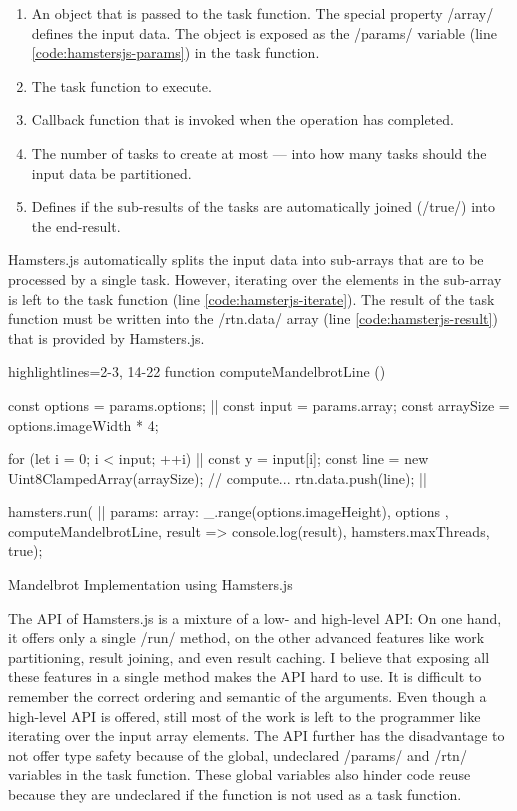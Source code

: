 \begin{enumerate}
	\item An object that is passed to the task function. The special property \javascriptinline/array/ defines the input data. The object is exposed as the \javascriptinline/params/ variable (line \ref{code:hamstersjs-params}) in the task function.
	\item The task function to execute.
	\item Callback function that is invoked when the operation has completed.
	\item The number of tasks to create at most --- into how many tasks should the input data be partitioned. 
	\item Defines if the sub-results of the tasks are automatically joined (\javascriptinline/true/) into the end-result.
\end{enumerate}

Hamsters.js automatically splits the input data into sub-arrays that are to be processed by a single task. However, iterating over the elements in the sub-array is left to the task function (line \ref{code:hamsterjs-iterate}). The result of the task function must be written into the \javascriptinline/rtn.data/ array (line \ref{code:hamsterjs-result}) that is provided by Hamsters.js. 

\begin{listing}
\begin{javascriptcode*}{highlightlines={2-3, 14-22}}
function computeMandelbrotLine () {
	const options = params.options; |$\label{code:hamstersjs-params}$|
	const input = params.array;
	const arraySize = options.imageWidth * 4;

	for (let i = 0; i < input; ++i) {|$\label{code:hamsterjs-iterate}$|
		const y = input[i];
		const line = new Uint8ClampedArray(arraySize);
		// compute...
		rtn.data.push(line); |$\label{code:hamsterjs-result}$|
	}
}

hamsters.run( |$\label{code:hamsterjs-start}$|
	params: {
		array: _.range(options.imageHeight),
		options
	},  
	computeMandelbrotLine, 
	result => console.log(result), 
	hamsters.maxThreads, 
	true);
\end{javascriptcode*}
\caption{Mandelbrot Implementation using Hamsters.js}
\label{fig:mandelbrot-hamsterjs}
\end{listing}

The API of Hamsters.js is a mixture of a low- and high-level API: On one hand, it offers only a single \javascriptinline/run/ method, on the other advanced features like work partitioning, result joining, and even result caching. I believe that exposing all these features in a single method makes the API hard to use. It is difficult to remember the correct ordering and semantic of the arguments. Even though a high-level API is offered, still most of the work is left to the programmer like iterating over the input array elements. The API further has the disadvantage to not offer type safety because of the global, undeclared \javascriptinline/params/ and \javascriptinline/rtn/ variables in the task function. These global variables also hinder code reuse because they are undeclared if the function is not used as a task function. 


